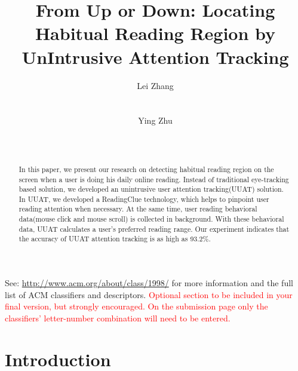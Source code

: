 \documentclass{sigchi}
\begin{document}
\title{From Up or Down: Locating Habitual Reading Region by UnIntrusive Attention Tracking}

\author{
  \alignauthor Lei Zhang\\
    \\
    \\
  \alignauthor Ying Zhu\\
    \\
    \\
}

\maketitle

\begin{abstract}

In this paper, we present our research on detecting habitual reading region 
on the screen when a user is doing his daily online reading. Instead of traditional eye-tracking based solution,
we developed an unintrusive user attention tracking(UUAT) solution. In UUAT, we developed a ReadingClue 
technology,  which helps to pinpoint user reading attention when necessary. At the same time, user reading behavioral data(mouse click and mouse scroll) is
collected in background. With these behavioral data, UUAT calculates a user's preferred reading range. Our experiment
indicates that the accuracy of UUAT attention tracking is as high as 93.2\%.





\end{abstract}



See: \url{http://www.acm.org/about/class/1998/}
for more information and the full list of ACM classifiers
and descriptors. \newline
\textcolor{red}{Optional section to be included in your final version, 
but strongly encouraged. On the submission page only the classifiers’ 
letter-number combination will need to be entered.}

\section{Introduction}
\end{document}
